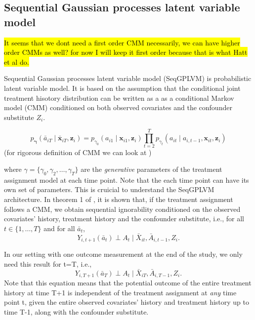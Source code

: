 \subsection{Sequential Gaussian processes latent variable model}
\label{sec:seqgplvm}
\hl{It seems that we dont need a first order CMM necessarily, we can have higher order CMMs as well? for now I 
will keep it first order because that is what Hatt et al do.}

Sequential Gaussian processes latent variable model (SeqGPLVM) is probabilistic latent variable 
model. It is based on the assumption that the conditional joint treatment hisotory distribution 
can be written as a as a conditional Markov model (CMM) conditioned on both observed covariates and
the confounder substitute $Z_i$. 
\begin{idassumpSG}\label{ass:SG-Marcovianity}
    \begin{equation}
    p_{\boldsymbol{\gamma}}(\bar{a}_{iT} \mid \bar{\mathbf{x}}_{iT}, \mathbf{z}_i) = p_{\gamma_0}(a_{i1} \mid \mathbf{x}_{i1}, \mathbf{z}_i) \prod_{t=2}^T p_{\gamma_t}(a_{it} \mid a_{i,t-1}, \mathbf{x}_{it}, \mathbf{z}_i)
    \end{equation}
    (for rigorous definition of CMM we can look at 
\cite{bouchattaouiCausalDynamicVariational2025})
\end{idassumpSG}


where \(\gamma = \{\gamma_0, \gamma_2, \ldots, \gamma_T\}\) are the \emph{generative} 
parameters of the treatment assignment model at each time point. Note that the each time point can have 
its own set of parameters. This is cruicial to understand the SeqGPLVM architecture. 
In theorem 1 of \cite{hattSequentialDeconfoundingCausal2024}, it is shown that, if the treatment 
assignment follows a CMM, we obtain sequential ignorability 
conditioned on the observed covariates' history, treatment history and the
confounder substitute, i.e., for all $t \in \{1, \ldots, T\}$ and for all $\bar{a}_t$,
\begin{equation}
    \label{eq:seqgplvm-single-unit-seqignorability}
    Y_{i,t+1}(\bar{a}_t) \perp A_t \mid \bar{X}_{it}, \bar{A}_{i,t-1} ,Z_{i}.
\end{equation}

In our setting with one outcome measurement at the end of the study, we only need this 
result for t=T, i.e.,
\begin{equation}
    \label{eq:seqgplvm-single-unit-seqignorability-t=T}
    Y_{i,T+1}(\bar{a}_T) \perp A_t \mid \bar{X}_{iT}, \bar{A}_{i,T-1} ,Z_{i}.
\end{equation}
Note that this equation means that the potential outcome of the entire treatment history at time T+1 is independent of the treatment assignment 
at \emph{any} time point t, given the entire observed covariates' history and treatment history up to time T-1, along with the confounder substitute. 


